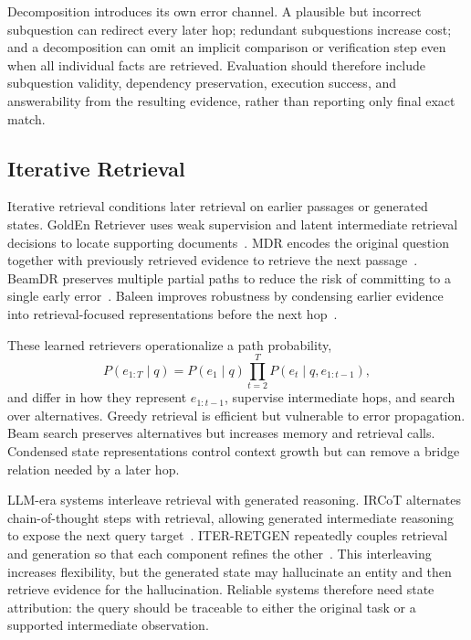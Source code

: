 Decomposition introduces its own error channel. A plausible but incorrect subquestion can redirect every later hop; redundant subquestions increase cost; and a decomposition can omit an implicit comparison or verification step even when all individual facts are retrieved. Evaluation should therefore include subquestion validity, dependency preservation, execution success, and answerability from the resulting evidence, rather than reporting only final exact match.

\subsection{Iterative Retrieval}
\label{subsec:iterative_retrieval}

Iterative retrieval conditions later retrieval on earlier passages or generated states. GoldEn Retriever uses weak supervision and latent intermediate retrieval decisions to locate supporting documents~\cite{min2019golden}. MDR encodes the original question together with previously retrieved evidence to retrieve the next passage~\cite{xiong2021mdr}. BeamDR preserves multiple partial paths to reduce the risk of committing to a single early error~\cite{zhao2021beamdr}. Baleen improves robustness by condensing earlier evidence into retrieval-focused representations before the next hop~\cite{khattab2021baleen}.

These learned retrievers operationalize a path probability,
\[
P(e_{1:T}\mid q)=P(e_1\mid q)\prod_{t=2}^{T}P(e_t\mid q,e_{1:t-1}),
\]
and differ in how they represent $e_{1:t-1}$, supervise intermediate hops, and search over alternatives. Greedy retrieval is efficient but vulnerable to error propagation. Beam search preserves alternatives but increases memory and retrieval calls. Condensed state representations control context growth but can remove a bridge relation needed by a later hop.

LLM-era systems interleave retrieval with generated reasoning. IRCoT alternates chain-of-thought steps with retrieval, allowing generated intermediate reasoning to expose the next query target~\cite{trivedi2023ircot}. ITER-RETGEN repeatedly couples retrieval and generation so that each component refines the other~\cite{shao2023iterretgen}. This interleaving increases flexibility, but the generated state may hallucinate an entity and then retrieve evidence for the hallucination. Reliable systems therefore need state attribution: the query should be traceable to either the original task or a supported intermediate observation.

